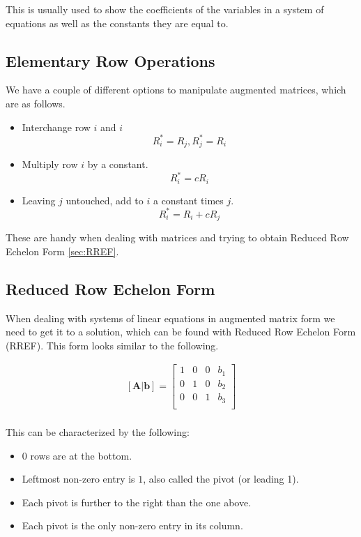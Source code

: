     This is usually used to show the coefficients of the variables in a system of equations as well as the constants they are equal to.

    \subsection{Elementary Row Operations}
    We have a couple of different options to manipulate augmented matrices, which are as follows.

    \begin{itemize}
        \item Interchange row $i$ and $i$
            \[ R^*_i = R_j, R^*_j = R_i \]
        \item Multiply row $i$ by a constant.
            \[ R^*_i = cR_i \]
        \item Leaving $j$ untouched, add to $i$ a constant times $j$.
            \[ R^*_i = R_i + cR_j \]
    \end{itemize}

    These are handy when dealing with matrices and trying to obtain Reduced Row Echelon Form \eqref{sec:RREF}.

    \subsection{Reduced Row Echelon Form}\label{sec:RREF}
    When dealing with systems of linear equations in augmented matrix form we need to get it to a solution, which can be found with Reduced Row Echelon Form (RREF). This form looks similar to the following.

    \begin{equation}\label{eq:rref}
    \begin{aligned}
        \mathbf{[A|b]}=
        \left[\begin{array}{ccc|c}
        1 & 0 & 0 & b_1\\
        0 & 1 & 0 & b_2\\
        0 & 0 & 1 & b_3\\
        \end{array}\right]\\
    \end{aligned}
    \end{equation}

    This can be characterized by the following:

    \begin{itemize}
        \item $0$ rows are at the bottom.
        \item Leftmost non-zero entry is $1$, also called the pivot (or leading 1).
        \item Each pivot is further to the right than the one above.
        \item Each pivot is the only non-zero entry in its column.
    \end{itemize}


